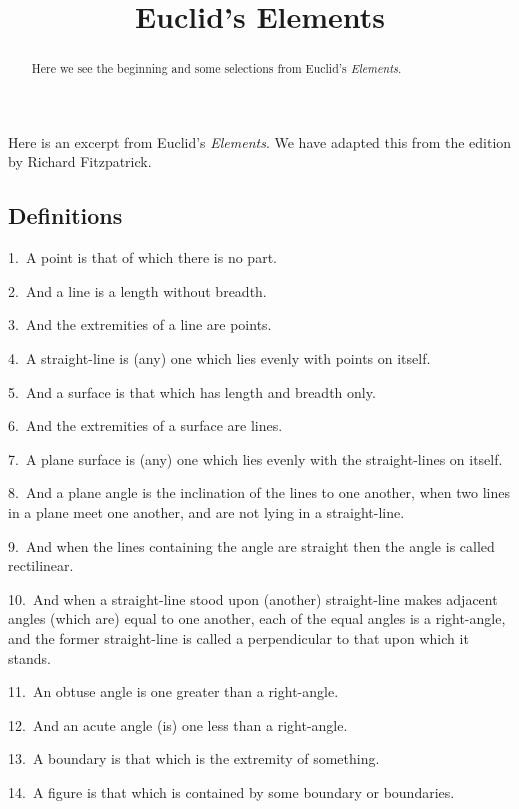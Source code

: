 \documentclass{ximera}
\title{Euclid's Elements}
\begin{document}
\begin{abstract}
Here we see the beginning and some selections from
Euclid's \textit{Elements}.
\end{abstract}
\maketitle


Here is an excerpt from Euclid's \textit{Elements}. We have adapted
this from the edition by Richard
Fitzpatrick.




{\setlength{\parindent}{0pt}
\subsection*{Definitions}

1.~A point is that of which there is no part.

2.~And a line is a length without breadth.

3.~And the extremities of a line are points.

4.~A straight-line is (any) one which lies  evenly with points on itself.

5.~And a surface is that which has length and breadth only.

6.~And the extremities of a surface are lines.

7.~A plane surface is (any) one which lies evenly with the straight-lines on itself.

8.~And a plane angle is the inclination of the lines to one another, when two lines in a plane 
meet one another, and are not lying in a straight-line.

9.~And when the lines containing the angle are straight then the angle is called rectilinear.

10.~And when a straight-line stood upon (another) straight-line makes adjacent angles (which are) equal to one another, each of the equal angles is a
right-angle, and the former straight-line  is called a perpendicular to that upon which it stands.

11.~An obtuse angle is one greater than a right-angle.

12.~And an acute angle (is) one less than a right-angle.

13.~A boundary is that which is the extremity of something.

14.~A figure is that which is contained by some boundary or boundaries.

}
\end{document}

